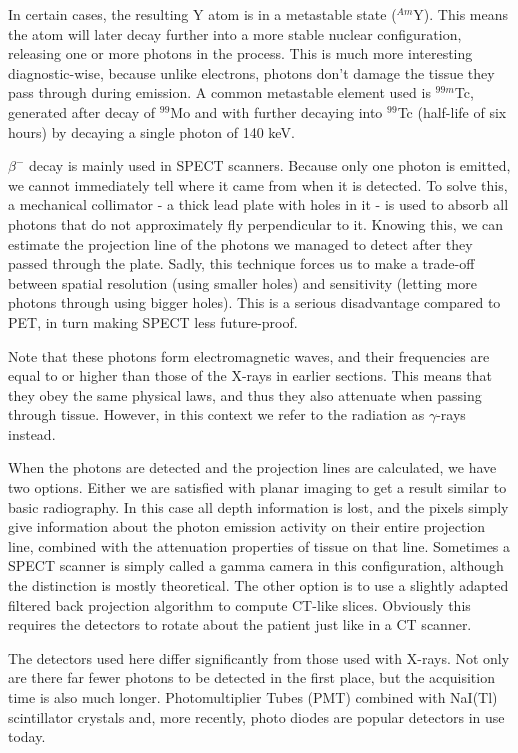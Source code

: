 In certain cases, the resulting Y atom is in a metastable state ($^{Am}$Y).
This means the atom will later decay further into a more stable nuclear
configuration, releasing one or more photons in the process. This is much more
interesting diagnostic-wise, because unlike electrons, photons don't damage the
tissue they pass through during emission. A common metastable element
used is $^{99m}$Tc, generated after decay of $^{99}$Mo and with further decaying
into $^{99}$Tc (half-life of six hours) by decaying a single photon of 140 keV.


$\beta^-$ decay is mainly used in SPECT scanners. Because only one photon is
emitted, we cannot immediately tell where it came from when it is detected. To
solve this, a mechanical collimator - a thick lead plate with holes in it - is
used to absorb all photons that do not approximately fly perpendicular to it.
Knowing this, we can estimate the projection line of the photons we managed to
detect after they passed through the plate. Sadly, this technique forces us to
make a trade-off between spatial resolution (using smaller holes) and
sensitivity (letting more photons through using bigger holes). This is a serious
disadvantage compared to PET, in turn making SPECT less future-proof.

Note that these photons form electromagnetic waves, and their frequencies are
equal to or higher than those of the X-rays in earlier sections. This means that
they obey the same physical laws, and thus they also attenuate when passing
through tissue. However, in this context we refer to the radiation as
$\gamma$-rays instead.

When the photons are detected and the projection lines are calculated, we have
two options. Either we are satisfied with planar imaging to get a result similar
to basic radiography. In this case all depth information is lost, and the pixels
simply give information about the photon emission activity on their entire
projection line, combined with the attenuation properties of tissue on that
line. Sometimes a SPECT scanner is simply called a gamma camera in this
configuration, although the distinction is mostly theoretical. The other option
is to use a slightly adapted filtered back projection algorithm to compute
CT-like slices. Obviously this requires the detectors to rotate about the
patient just like in a CT scanner.

The detectors used here differ significantly from those used with X-rays. Not
only are there far fewer photons to be detected in the first place, but the
acquisition time is also much longer. Photomultiplier Tubes (PMT) combined with
NaI(Tl) scintillator crystals and, more recently, photo diodes are
popular detectors in use today.

